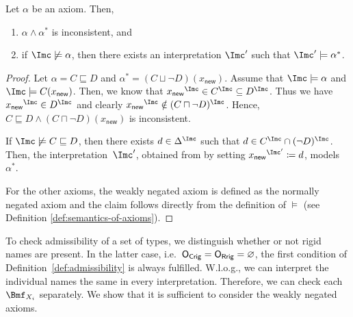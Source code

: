 \begin{lemma}\label{lem:weakly-negation-inconsistent}
  Let $\alpha$ be an axiom. Then,
  \begin{enumerate}
  \item $\alpha\land\alpha^{*}$ is inconsistent, and
  \item if $\I\not\models\alpha$, then there exists an interpretation $\I'$ such that $\I'\models\alpha^{*}$.
  \end{enumerate}
\end{lemma}
\begin{proof}
  Let $\alpha = C \sqsubseteq D$ and $\alpha^{*} = (C \sqcup \lnot D)(x_{\mathsf{new}})$. Assume
  that $\I \models \alpha$ and $\I \models C(x_{\mathsf{new}})$.  Then, we know that
  ${x_{\mathsf{new}}}^{\I} \in C^{\I} \subseteq D^{\I}$. Thus we have
  ${x_{\mathsf{new}}}^{\I} \in D^{\I}$ and clearly
  ${x_{\mathsf{new}}}^{\I} \notin (C \sqcap \lnot D)^{\I}$. Hence,
  $C \sqsubseteq D \land (C \sqcap \lnot D)(x_{\mathsf{new}})$ is inconsistent.

  If $\I\not\models C \sqsubseteq D$, then there exists $d\in\Delta^{\I}$ such that
  $d \in C^{\I} \cap (\lnot D)^{\I}$. Then, the interpretation~$\I'$, obtained from \I by setting
  ${x_{\mathsf{new}}}^{\I'} \coloneqq d$, models $\alpha^{*}$.

  For the other axioms, the weakly negated axiom is defined as the normally negated axiom and the
  claim follows directly from the definition of $\models$ (see Definition
  \ref{def:semantics-of-axioms}).
\end{proof}

To check admissibility of a set of types, we distinguish whether or not rigid names are present. In
the latter case, i.e.\ $\mathsf{O_{Crig}}=\mathsf{O_{Rrig}}=\varnothing$, the first condition of
Definition~\ref{def:admissibility} is always fulfilled. W.l.o.g., we can interpret the individual
names the same in every interpretation. Therefore, we can check each $\Bmf_{X_{i}}$ separately. We
show that it is sufficient to consider the weakly negated axioms.



